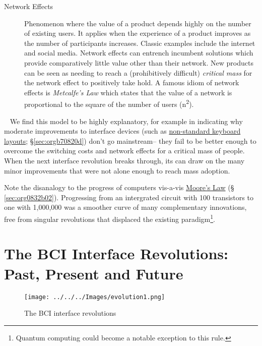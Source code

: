 \documentclass[logo,bsc,singlespacing,parskip]{infthesis}
\begin{document}
\begin{mdframed}
\begin{description}
\item[{Network Effects\label{network effects}}] Phenomenon where the value of a product depends highly on the number of existing users.
It applies when the experience of a product improves as the number of participants increases.
Classic examples include the internet and social media.
Network effects can entrench incumbent solutions which provide comparatively little value other than their network.
New products can be seen as needing to reach a (prohibitively difficult) \emph{critical mass} for the network effect to positively take hold.
A famous idiom of network effects is \emph{Metcalfe's Law} which states that the value of a network is proportional to the square of the number of users (n\textsuperscript{2}).
\end{description}
\end{mdframed}
~
We find this model to be highly explanatory, for example in indicating why moderate improvements to interface devices (such as \hyperref[sec:orgb70820d]{non-standard keyboard layouts}; \S \ref{sec:orgb70820d}) don't go mainstream-- they  fail to be better enough to overcome the switching costs and network effects for a critical mass of people.
When the next interface revolution breaks through, its can draw on the many minor improvements that were not alone enough to reach mass adoption.

Note the disanalogy to the progress of computers vis-a-vis \hyperref[sec:org0832b02]{Moore's Law} (§ \ref{sec:org0832b02}).
Progressing from an intergrated circuit with 100 transistors to one with 1,000,000 was a smoother curve of many complementary innovations, free from singular revolutions that displaced the existing paradigm\footnote{Quantum computing could become a notable exception to this rule.}.

\chapter{The BCI Interface Revolutions: Past, Present and Future}
\label{sec:org38ffd89}
\setcounter{section}{-1}
\begin{figure}[h]
\centering
\texttt{[image: ../../../Images/evolution1.png]}
\caption{The BCI interface revolutions}
\end{figure}
\end{document}
